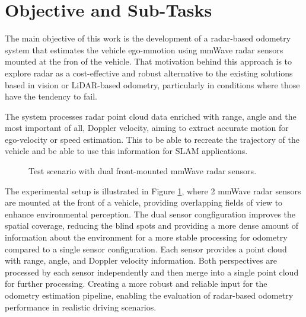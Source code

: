 \section{Objective and Sub-Tasks}
\label{sec:objective}
The main objective of this work is the development of a radar-based odometry system that estimates the vehicle ego-mmotion using mmWave radar sensors mounted at the fron of the vehicle.
That motivation behind this approach is to explore radar as a cost-effective and robust alternative to the existing solutions based in vision or LiDAR-based odometry, particularly in conditions where those have the tendency to fail.

The system processes radar point cloud data enriched with range, angle and the most important of all, Doppler velocity, aiming to extract accurate motion for ego-velocity or speed estimation.
This to be able to recreate the trajectory of the vehicle and be able to use this information for SLAM applications.

\begin{figure}[!htbp]
    \centering
    \caption{Test scenario with dual front-mounted mmWave radar sensors.}
    \label{fig:test_scenario}
\end{figure}

The experimental setup is illustrated in Figure \ref{fig:test_scenario}, where 2 mmWave radar sensors are mounted at the front of a vehicle, providing overlapping fields of view to enhance environmental perception.
The dual sensor congfiguration improves the spatial coverage, reducing the blind spots and providing a more dense amount of information about the environment for a more stable processing for odometry compared to a single sensor configuration.
Each sensor provides a point cloud with range, angle, and Doppler velocity information.
Both perspectives are processed by each sensor independently and then merge into a single point cloud for further processing.
Creating a more robust and reliable input for the odometry estimation pipeline, enabling the evaluation of radar-based odometry performance in realistic driving scenarios.


